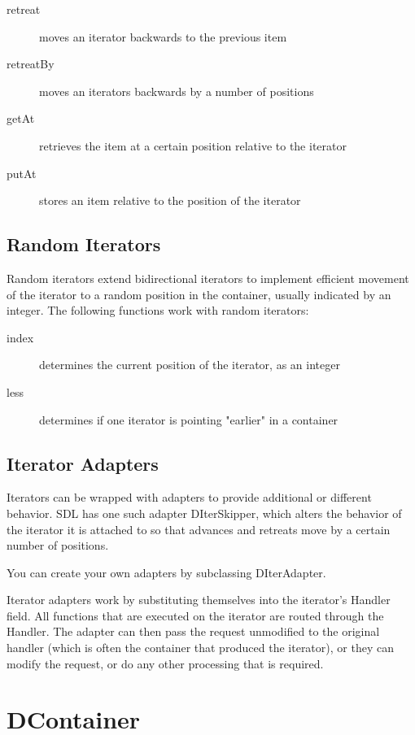 \documentclass{report}
\begin{document}
\begin{description}
\item[retreat] moves an iterator backwards to the previous item
\item[retreatBy] moves an iterators backwards by a number of positions
\item[getAt] retrieves the item at a certain position relative to the iterator
\item[putAt] stores an item relative to the position of the iterator
\end{description}

\subsection{Random Iterators}

Random iterators extend bidirectional iterators to implement efficient
movement of the iterator to a random position in the container, usually
indicated by an integer. The following functions work with random iterators:

\begin{description}
\item[index] determines the current position of the iterator, as an integer
\item[less] determines if one iterator is pointing "earlier" in a container
\end{description}

\subsection{Iterator Adapters}

Iterators can be wrapped with adapters to provide additional or different
behavior. SDL has one such adapter DIterSkipper, which alters the behavior
of the iterator it is attached to so that advances and retreats move by a
certain number of positions.

You can create your own adapters by subclassing DIterAdapter.

Iterator adapters work by substituting themselves into the iterator's
Handler field. All functions that are executed on the iterator are routed
through the Handler. The adapter can then pass the request unmodified to the
original handler (which is often the container that produced the iterator),
or they can modify the request, or do any other processing that is required.

\section{DContainer}
\end{document}
